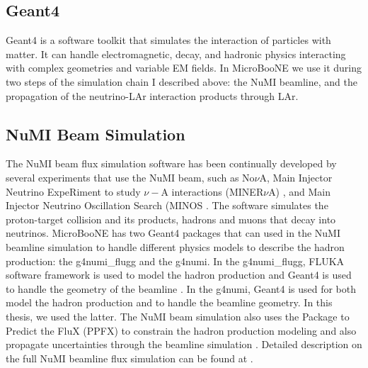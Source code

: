 \subsection{Geant4}

 Geant4 \cite{g4} is a software toolkit that simulates the interaction of particles with matter. It can handle electromagnetic, decay, and hadronic physics interacting with complex geometries and variable EM fields. In MicroBooNE we use it during two steps of the simulation chain I described above: the NuMI beamline, and the propagation of the neutrino-LAr interaction products through LAr.

\subsection{NuMI Beam Simulation}

The NuMI beam flux simulation software has been continually developed by several experiments that use the NuMI beam, such as No$\nu$A, Main Injector Neutrino ExpeRiment to study $\nu-$A interactions (MINER$\nu$A) \cite{minerva}, and Main Injector Neutrino Oscillation Search (MINOS \cite{minos}. The software simulates the proton-target collision and its products, hadrons and muons that decay into neutrinos. MicroBooNE has two Geant4 packages that can used in the NuMI beamline simulation to handle different physics models to describe the hadron production: the g4numi\_flugg and the g4numi. In the g4numi\_flugg, FLUKA software framework is used to model the hadron production and Geant4 is used to handle the geometry of the beamline \cite{fluka}. In the g4numi, Geant4 is used for both model the hadron production and to handle the beamline geometry. In this thesis, we used the latter. 
The NuMI beam simulation also uses the Package to Predict the FluX (PPFX) to constrain the hadron production modeling and also propagate uncertainties through the beamline simulation \cite{ppfx}. Detailed description on the full NuMI beamline flux simulation can be found at \cite{krish}. 

